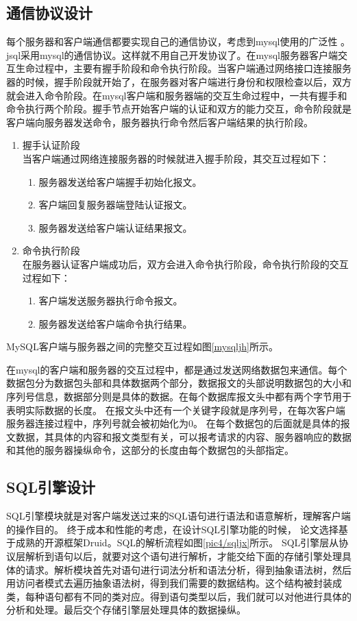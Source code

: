 \subsection{通信协议设计}
每个服务器和客户端通信都要实现自己的通信协议，考虑到mysql使用的广泛性
。jsql采用mysql的通信协议。这样就不用自己开发协议了。在mysql服务器客户端交互生命过程中，主要有握手阶段和命令执行阶段。当客户端通过网络接口连接服务器的时候，握手阶段就开始了，在服务器对客户端进行身份和权限检查以后，双方就会进入命令阶段。在mysql客户端和服务器端的交互生命过程中，一共有握手和命令执行两个阶段。握手节点开始客户端的认证和双方的能力交互，命令阶段就是客户端向服务器发送命令，服务器执行命令然后客户端结果的执行阶段。

\begin{enumerate}[fullwidth,itemindent=2em,listparindent=2em]
	\item 握手认证阶段\\
	当客户端通过网络连接服务器的时候就进入握手阶段，其交互过程如下：
	\begin{enumerate}
		\item 服务器发送给客户端握手初始化报文。
		\item 客户端回复服务器端登陆认证报文。
		\item 服务器发送给客户端认证结果报文。
	\end{enumerate}
	\item 命令执行阶段\\
	在服务器认证客户端成功后，双方会进入命令执行阶段，命令执行阶段的交互过程如下：
	\begin{enumerate}
		\item 	客户端发送服务器执行命令报文。
		\item 服务器发送给客户端命令执行结果。
	\end{enumerate}
\end{enumerate}

MySQL客户端与服务器之间的完整交互过程如图\ref{mysqljh}所示。

在mysql的客户端和服务器的交互过程中，都是通过发送网络数据包来通信。每个数据包分为数据包头部和具体数据两个部分，数据报文的头部说明数据包的大小和序列号信息，数据部分则是具体的数据。在每个数据库报文头中都有两个字节用于表明实际数据的长度。
在报文头中还有一个关键字段就是序列号，在每次客户端服务器连接过程中，序列号就会被初始化为0。
在每个数据包的后面就是具体的报文数据，其具体的内容和报文类型有关，可以报考请求的内容、服务器响应的数据和其他的服务器操纵命令，这部分的长度由每个数据包的头部指定。
\subsection{SQL引擎设计}
SQL引擎模块就是对客户端发送过来的SQL语句进行语法和语意解析，理解客户端的操作目的。
终于成本和性能的考虑，在设计SQL引擎功能的时候，
论文选择基于成熟的开源框架Druid。SQL的解析流程如图\ref{pic4/sqljx}所示。
SQL引擎层从协议层解析到语句以后，就要对这个语句进行解析，才能交给下面的存储引擎处理具体的请求。解析模块首先对语句进行词法分析和语法分析，得到抽象语法树，然后用访问者模式去遍历抽象语法树，得到我们需要的数据结构。这个结构被封装成类，每种语句都有不同的类对应。得到语句类型以后，我们就可以对他进行具体的分析和处理。最后交个存储引擎层处理具体的数据操纵。
